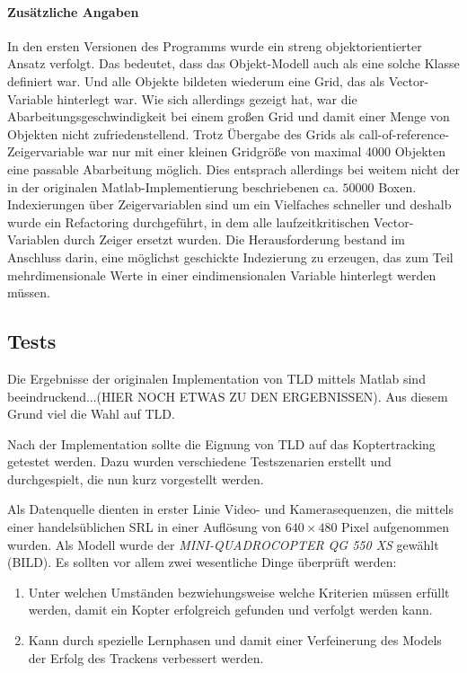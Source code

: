 \paragraph{Zusätzliche Angaben}
In den ersten Versionen des Programms wurde ein streng objektorientierter Ansatz verfolgt. Das bedeutet, dass das Objekt-Modell auch als eine solche Klasse definiert war. Und alle Objekte bildeten wiederum eine Grid, das als Vector-Variable hinterlegt war. Wie sich allerdings gezeigt hat, war die Abarbeitungsgeschwindigkeit bei einem großen Grid und damit einer Menge von Objekten nicht zufriedenstellend. Trotz Übergabe des Grids als call-of-reference-Zeigervariable war nur mit einer kleinen Gridgröße von maximal 4000 Objekten eine passable Abarbeitung möglich. Dies entsprach allerdings bei weitem nicht der in der originalen Matlab-Implementierung beschriebenen ca. $50000$ Boxen. Indexierungen über Zeigervariablen sind um ein Vielfaches schneller und deshalb wurde ein Refactoring durchgeführt, in dem alle laufzeitkritischen Vector-Variablen durch Zeiger ersetzt wurden. Die Herausforderung bestand im Anschluss darin, eine möglichst geschickte Indezierung zu erzeugen, das zum Teil mehrdimensionale Werte in einer eindimensionalen Variable hinterlegt werden müssen.

\subsection{Tests}
Die Ergebnisse der originalen Implementation von TLD mittels Matlab sind beeindruckend...(HIER NOCH ETWAS ZU DEN ERGEBNISSEN). Aus diesem Grund viel die Wahl auf TLD.

Nach der Implementation sollte die Eignung von TLD auf das Koptertracking getestet werden. Dazu wurden verschiedene Testszenarien erstellt und durchgespielt, die nun kurz vorgestellt werden.

Als Datenquelle dienten in erster Linie Video- und Kamerasequenzen, die mittels einer handelsüblichen SRL in einer Auflösung von $640\times480$ Pixel aufgenommen wurden. Als Modell wurde der \textit{MINI-QUADROCOPTER QG 550 XS} gewählt (BILD). Es sollten vor allem zwei wesentliche Dinge überprüft werden:

\begin{enumerate}
\item Unter welchen Umständen bezwiehungsweise welche Kriterien müssen erfüllt werden, damit ein Kopter erfolgreich gefunden und verfolgt werden kann.
\item Kann durch spezielle Lernphasen und damit einer Verfeinerung des Models der Erfolg des Trackens verbessert werden.
\end{enumerate}

